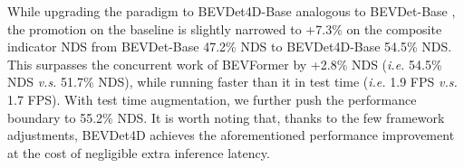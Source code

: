 \documentclass[10pt,twocolumn,letterpaper]{article}
\begin{document}
While upgrading the paradigm to BEVDet4D-Base analogous to BEVDet-Base \cite{BEVDet}, the promotion on the baseline is slightly narrowed to +7.3\% on the composite indicator NDS from BEVDet-Base 47.2\% NDS to BEVDet4D-Base 54.5\% NDS. This surpasses the concurrent work of BEVFormer \cite{BEVFormer} by +2.8\% NDS (\textit{i.e.} 54.5\% NDS \textit{v.s.} 51.7\% NDS), while running faster than it in test time (\textit{i.e.} 1.9 FPS \textit{v.s.} 1.7 FPS). With test time augmentation, we further push the performance boundary to 55.2\% NDS. It is worth noting that, thanks to the few framework adjustments, BEVDet4D achieves the aforementioned performance improvement at the cost of negligible extra inference latency.


\begin{table*}[t]
  \centering
  \caption{Results of ablation study on the nuScenes \texttt{val} set. The align operation includes rotation (R) and translation (T). Extra denotes the extra BEV encoder. Aug. denotes the augmentation in time dimension when selecting the adjacent frame.}
\end{table*}
\end{document}

